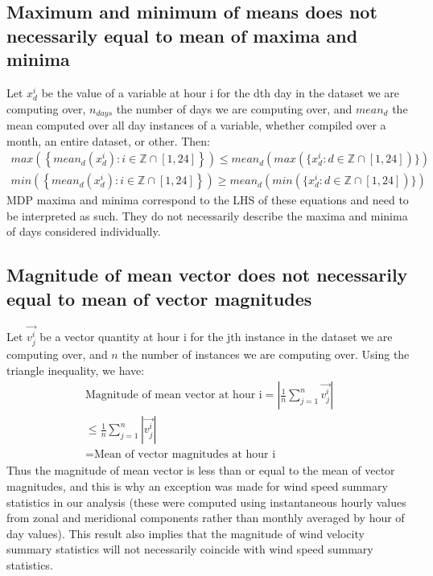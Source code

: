 \subsection{Maximum and minimum of means does not necessarily equal to mean of maxima and minima}

Let $x^i_d$ be the value of a variable at hour i for the dth day in the dataset we are computing over, $n_{days}$ the number of days we are computing over, and $mean_d$ the mean computed over all day instances of a variable, whether compiled over a month, an entire dataset, or other. Then:
\begin{eqnarray}
	max\left( \left\{ mean_d(x^i_d) : i \in \mathbb{Z} \cap [1,24] \right\} \right) \leq mean_d \left( max( \{ x^i_d : d \in \mathbb{Z} \cap [1,24]) \} \right) \\
	min\left( \left\{ mean_d(x^i_d) : i \in \mathbb{Z} \cap [1,24] \right\} \right) \geq mean_d \left( min( \{ x^i_d : d \in \mathbb{Z} \cap [1,24]) \} \right)
\end{eqnarray}
\ac{MDP} maxima and minima correspond to the LHS of these equations and need to be interpreted as such. They do not necessarily describe the maxima and minima of days considered individually.

\subsection{Magnitude of mean vector does not necessarily equal to mean of vector magnitudes}

Let $\vec{v^i_j}$ be a vector quantity at hour i for the jth instance in the dataset we are computing over, and $n$ the number of instances we are computing over. Using the triangle inequality, we have:
\begin{eqnarray}
	\mbox{Magnitude of mean vector at hour i} = \left| \frac{1}{n} \sum_{j=1}^{n} \vec{v^i_j} \right| \\
	\leq \frac{1}{n} \sum_{j=1}^{n} |\vec{v^i_j}| \nonumber \\
	= \mbox{Mean of vector magnitudes at hour i} \nonumber
\end{eqnarray}
Thus the magnitude of mean vector is less than or equal to the mean of vector magnitudes, and this is why an exception was made for wind speed summary statistics in our analysis (these were computed using instantaneous hourly values from zonal and meridional components rather than monthly averaged by hour of day values). This result also implies that the magnitude of wind velocity summary statistics will not necessarily coincide with wind speed summary statistics.

